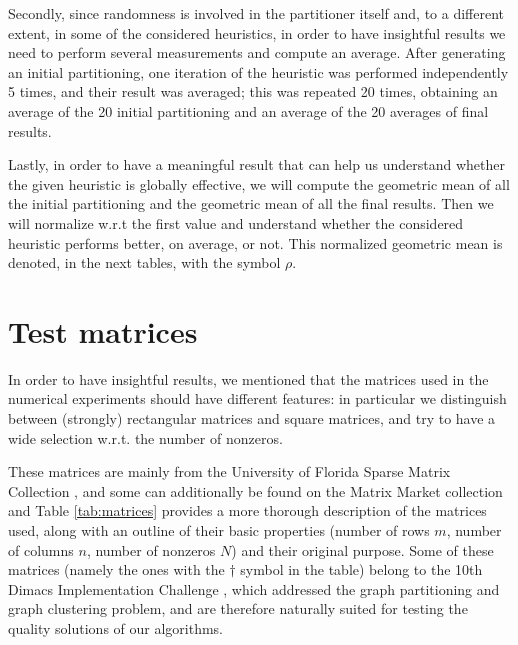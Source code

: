 Secondly, since randomness is involved in the partitioner itself and, to a different extent, in some of the considered heuristics, in order to have insightful results we need to perform several measurements and compute an average. After generating an initial partitioning, one iteration of the heuristic was performed independently 5 times, and their result was averaged; this was repeated 20 times, obtaining an average of the 20 initial partitioning and an average of the 20 averages of final results. 

Lastly, in order to have a meaningful result that can help us understand whether the given heuristic is globally effective, we will compute the geometric mean of all the initial partitioning and the geometric mean of all the final results. Then we will normalize w.r.t the first value and understand whether the considered heuristic performs better, on average, or not. This normalized geometric mean is denoted, in the next tables, with the symbol $\rho$.

\section{Test matrices} \label{sec:test_matrices}

In order to have insightful results, we mentioned that the matrices used in the numerical experiments should have different features: in particular we distinguish between  (strongly) rectangular matrices and square matrices, and try to have a wide selection w.r.t. the number of nonzeros. 

These matrices are mainly from the University of Florida Sparse Matrix Collection \cite{ufl}, and some can additionally be found on the Matrix Market collection \cite{matrixmarket} and Table \ref{tab:matrices} provides a more thorough description of the matrices used, along with an outline of their basic properties (number of rows $m$, number of columns $n$, number of nonzeros $N$) and their original purpose. Some of these matrices (namely the ones with the $\dagger$ symbol in the table) belong to the 10th Dimacs Implementation Challenge \cite{dimacs}, which addressed the graph partitioning and graph clustering problem, and are therefore naturally suited for testing the quality solutions of our algorithms.


